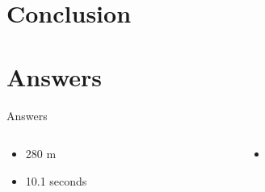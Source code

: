 \documentclass{beamer}
\begin{document}
\section{Conclusion}

\section{Answers}

\begin{frame}{Answers}
\begin{columns}[T]
\begin{column}{0.5\textwidth}
\begin{itemize}
\item 280 m
\item 10.1 seconds
\end{itemize}
\end{column}
\begin{column}{0.5\textwidth}
\begin{itemize}
\item
\end{itemize}
\end{column}
\end{columns}
\end{frame}
\end{document}
